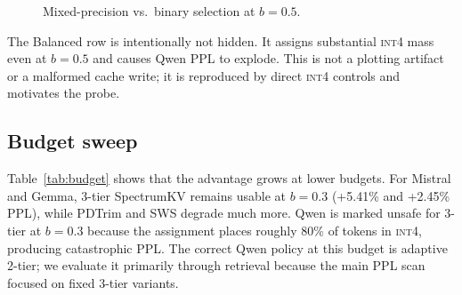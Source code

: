 \documentclass[11pt]{article}
\newcommand{\method}{SpectrumKV}
\newcommand{\budget}{b}
\newcommand{\pct}{\%}
\newcommand{\intiv}{\textsc{int4}}
\theoremstyle{plain}
\theoremstyle{definition}
\begin{document}
\begin{figure}[H]
\centering
{}
\caption{Mixed-precision vs.\ binary selection at $\budget=0.5$.}
\label{fig:ppl50}
\end{figure}

The Balanced row is intentionally not hidden.  It assigns substantial \intiv{} mass even at $\budget=0.5$ and causes Qwen PPL to explode.  This is not a plotting artifact or a malformed cache write; it is reproduced by direct \intiv{} controls and motivates the probe.

\subsection{Budget sweep}
\label{sec:rq8}

Table~\ref{tab:budget} shows that the advantage grows at lower budgets.  For Mistral and Gemma, 3-tier \method{} remains usable at $\budget=0.3$ (+5.41\pct{} and +2.45\pct{} PPL), while PDTrim and SWS degrade much more.  Qwen is marked unsafe for 3-tier at $\budget=0.3$ because the assignment places roughly 80\pct{} of tokens in \intiv{}, producing catastrophic PPL.  The correct Qwen policy at this budget is adaptive 2-tier; we evaluate it primarily through retrieval because the main PPL scan focused on fixed 3-tier variants.
\end{document}
